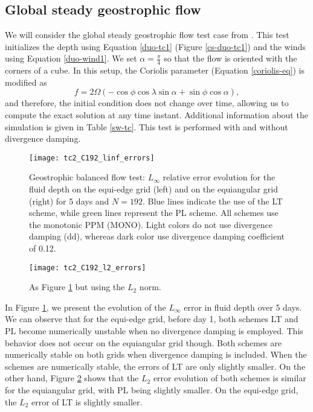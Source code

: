 \subsection{Global steady geostrophic flow}
We will consider the global steady geostrophic flow test case from \citet{will:1992}.
This test initializes the depth using Equation \eqref{duo-tc1} (Figure \ref{cs-duo-tc1}) and the winds using Equation \eqref{duo-wind1}.
We set $\alpha=\frac{\pi}{4}$ so that the flow is oriented with the corners of a cube.
In this setup, the Coriolis parameter (Equation \eqref{coriolis-eq}) is modified as
\begin{equation}
	\label{coriolis-eq2}
	f = 2 \Omega(-\cos{\phi}\cos{\lambda}\sin{\alpha} + \sin{\phi}\cos{\alpha}),
\end{equation}
and therefore, the initial condition does not change over time, allowing us to compute the exact solution at any time instant.
Additional information about the simulation is given in Table \ref{sw-tc}. This test is performed with and without divergence damping.
\begin{figure}[!htb]
	\centering
	\texttt{[image: tc2\_C192\_linf\_errors]}
	\caption{Geostrophic balanced flow test:
	$L_{\infty}$ relative error evolution for the fluid depth on the equi-edge grid (left)
		and on the equiangular grid (right) for 5 days and $N=192$.
		Blue lines indicate the use of the LT scheme, while green lines represent the PL scheme.
		All schemes use the monotonic PPM (MONO). 
		Light colors do not use divergence damping (dd), whereas dark color use divergence damping coefficient of 0.12.
		\label{chp-advcs-sec-exp-sw-evol-linf}}
\end{figure}
\begin{figure}[!htb]
	\centering
	\texttt{[image: tc2\_C192\_l2\_errors]}
	\caption{ As Figure \ref{chp-advcs-sec-exp-sw-evol-linf} but using the 
		$L_{2}$ norm.
		\label{chp-advcs-sec-exp-sw-evol-l2}}
\end{figure}

\newpage
In Figure \ref{chp-advcs-sec-exp-sw-evol-linf}, we present the evolution of the $L_{\infty}$ error in fluid depth over 5 days.
We can observe that for the equi-edge grid, before day 1, both schemes LT and PL become numerically unstable when no divergence damping is employed.
This behavior does not occur on the equiangular grid though.
Both schemes are numerically stable on both grids when divergence damping is included.
When the schemes are numerically stable, the errors of LT are only slightly smaller.
On the other hand, Figure \ref{chp-advcs-sec-exp-sw-evol-l2} shows that the $L_2$ error evolution of both schemes is similar for the equiangular grid, 
with PL being slightly smaller.
On the equi-edge grid, the $L_2$ error of LT is slightly smaller.


